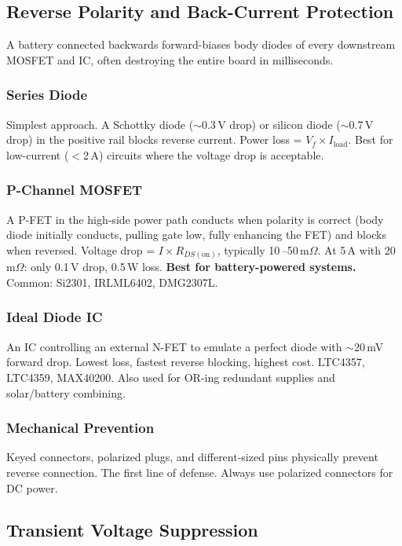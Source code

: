 \documentclass[11pt,letterpaper,twoside,openany]{book}
\begin{document}
\subsection{Reverse Polarity and Back-Current Protection}
\label{sec:reverse}

A battery connected backwards forward-biases body diodes of every downstream MOSFET and IC, often destroying the entire board in milliseconds.

\subsubsection{Series Diode}
Simplest approach. A Schottky diode ($\sim$0.3\,V drop) or silicon diode ($\sim$0.7\,V drop) in the positive rail blocks reverse current. Power loss = $V_f \times I_{\text{load}}$. Best for low-current ($<$2\,A) circuits where the voltage drop is acceptable.

\subsubsection{P-Channel MOSFET}
A P-FET in the high-side power path conducts when polarity is correct (body diode initially conducts, pulling gate low, fully enhancing the FET) and blocks when reversed. Voltage drop = $I \times R_{DS(\text{on})}$, typically 10\,--50\,m$\Omega$. At 5\,A with 20\,m$\Omega$: only 0.1\,V drop, 0.5\,W loss. \textbf{Best for battery-powered systems.} Common: Si2301, IRLML6402, DMG2307L.

\subsubsection{Ideal Diode IC}
An IC controlling an external N-FET to emulate a perfect diode with $\sim$20\,mV forward drop. Lowest loss, fastest reverse blocking, highest cost. LTC4357, LTC4359, MAX40200. Also used for OR-ing redundant supplies and solar/battery combining.

\subsubsection{Mechanical Prevention}
Keyed connectors, polarized plugs, and different-sized pins physically prevent reverse connection. The first line of defense. Always use polarized connectors for DC power.


\subsection{Transient Voltage Suppression}
\label{sec:transient}
\end{document}
